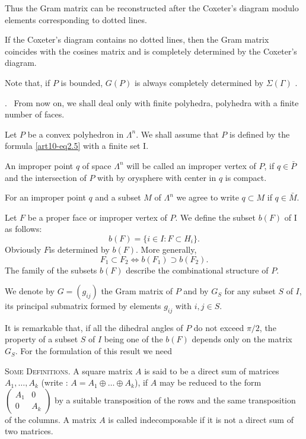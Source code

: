 Thus the Gram matrix can be reconstructed after the Coxeter's diagram modulo elements corresponding to dotted lines.

If the Coxeter's diagram contains no dotted lines, then the Gram matrix coincides with the cosines matrix and is completely determined by the Coxeter's diagram.

Note that, if $P$ is bounded, $G(P)$ is always completely determined by $\Sigma (\Gamma)$ \cite{art10-key7}.

.~ From now on, we shall deal only with finite polyhedra, \ie poly\-hedra with a finite number of faces. 

Let $P$ be a convex polyhedron in $\Lambda^n$. We shall assume that $P$ is defined by the formula \eqref{art10-eq2.5} with a finite set I.

An improper point $q$ of space $\Lambda^n$ will be called an improper vertex of $P$, if $q \in \bar{P}$ and the intersection of $P$ with by orysphere with center in $q$ is compact. 

For an improper point $q$ and a subset $M$ of $\Lambda^{n}$ we agree to write $q \subset M$ if $q \in \bar{M}$.

Let $F$ be a proper face or improper vertex of $P$. We define the subset $b(F)$ of I as follows:
$$
b(F) = \{i \in I: F \subset H_i\}.
$$
Obviously $F$\pageoriginale is determined by $b(F)$. More generally,
$$
F_1 \subset F_2 \Leftrightarrow b(F_1) \supset b (F_2).
$$
The family of the subsets $b(F)$ describe the combinational structure of $P$.

We denote by $G = (g_{ij})$ the Gram matrix of $P$ and by $G_S$ for any subset $S$ of $I$, its principal submatrix formed by elements  $g_{ij}$ with $i, j \in S$.

It is remarkable that, if all the dihedral angles of $P$ do not exceed $\pi/2$, the property of a subset $S$ of $I$ being one of the $b(F)$ depends only on the matrix $G_S$. For the formulation of this result we need

\textsc{Some Definitions.} A square matrix $A$ is said to be a direct sum of matrices $A_1, \ldots, A_k$ (write : $A = A_1 \oplus \ldots \oplus A_k$),  if $A$ may be reduced to the form $\begin{pmatrix}
A_1 & 0 \\ 0 & A_k \end{pmatrix}$ by a suitable transposition of the rows and the same transposition of the columns. A matrix $A$ is called indecomposable if it is not a direct sum of two matrices. 

